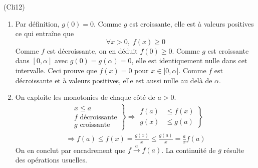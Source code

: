 \begin{tiny}(Cli12)\end{tiny} 
\begin{enumerate}
  \item Par définition, $g(0)=0$. Comme $g$ est croissante, elle est à valeurs positives ce qui entraîne que 
\begin{displaymath}
\forall x > 0,\; f(x)\geq 0  
\end{displaymath}
Comme $f$ est décroissante, on en déduit $f(0)\geq 0$.\newline
Comme $g$ est croissante dans $[0,\alpha]$ avec $g(0)=g(\alpha)=0$, elle est identiquement nulle dans cet intervalle. Ceci prouve que
$f(x)=0$ pour $x\in]0,\alpha]$. Comme $f$ est décroissante et à valeurs positives, elle est aussi nulle au delà de $\alpha$.

  \item On exploite les monotonies de chaque côté de $a > 0$.
\begin{multline*}
\left. 
\begin{aligned}
  &x \leq a \\ &f \text{ décroissante} \\ &g \text{ croissante}
\end{aligned}
\right\rbrace \Rightarrow
\left. 
\begin{aligned}
  f(a) &\leq f(x) \\ g(x) &\leq g(a)
\end{aligned}
\right\rbrace\\
\Rightarrow
f(a) \leq f(x) = \frac{g(x)}{x} \leq \frac{g(a)}{x} = \frac{a}{x} f(a)
\end{multline*}
On en conclut par encadrement que $f\xrightarrow{a} f(a)$. La continuité de $g$ résulte des opérations usuelles. 
\end{enumerate}

